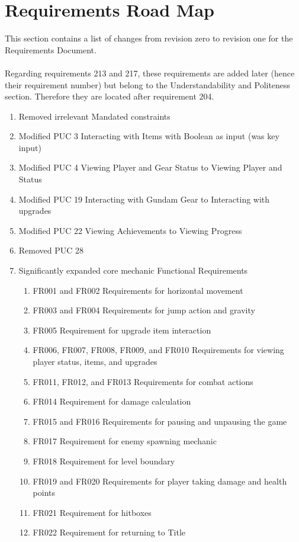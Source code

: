 \documentclass[]{article}
\begin{document}
\section*{Requirements Road Map}
This section contains a list of changes from revision zero to revision one for the Requirements Document.\\\\
Regarding requirements 213 and 217, these requirements are added later (hence their requirement number) but belong to the Understandability and Politeness section. Therefore they are located after requirement 204. 
\begin{enumerate}
	\item Removed irrelevant Mandated constraints
	\item Modified PUC 3 Interacting with Items with Boolean as input (was key input)
	\item Modified PUC 4 Viewing Player and Gear Status to Viewing Player and Status
	\item Modified PUC 19 Interacting with Gundam Gear to Interacting with upgrades
	\item Modified PUC 22 Viewing Achievements to Viewing Progress
	\item Removed PUC 28
	\item Significantly expanded core mechanic Functional Requirements
	\begin{enumerate}
		\item FR001 and FR002 Requirements for horizontal movement
		\item FR003 and FR004 Requirements for jump action and gravity
		\item FR005 Requirement for upgrade item interaction
		\item FR006, FR007, FR008, FR009, and FR010  Requirements for viewing player status, items, and upgrades
		\item FR011, FR012, and FR013 Requirements for combat actions
		\item FR014 Requirement for damage calculation
		\item FR015 and FR016 Requirements for pausing and unpausing the game
		\item FR017 Requirement for enemy spawning mechanic
		\item FR018 Requirement for level boundary
		\item FR019 and FR020 Requirements for player taking damage and health points
		\item FR021 Requirement for hitboxes
		\item FR022 Requirement for returning to Title

\end{enumerate}
\end{enumerate}
\end{document}
